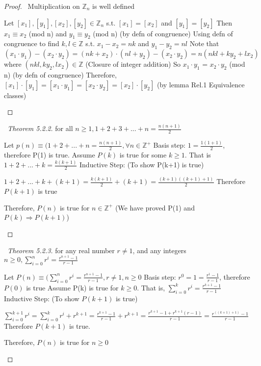 \documentclass[a4paper]{article}
\theoremstyle{definition}
\begin{document}
\begin{proof}{\proofname\ Multiplication on $\mathbb{Z}_n$ is well defined}
  \begin{numpf}
    \pfln Let $[x_1], [y_1], [x_2], [y_2] \in \mathbb{Z}_n$ s.t. $[x_1] = [x_2]$ and $[y_1] = [y_2]$
    \pfln Then $x_1 \equiv x_2$ (mod n) and $y_1 \equiv y_2$ (mod n) (by defn of congruence)
    \pfln Using defn of congruence to find $k, l \in \mathbb{Z}$ s.t. $x_1 - x_2 = nk$ and $y_1 - y_2 = nl$
    \pfln Note that $(x_1 \cdot y_1) - (x_2 \cdot y_2) = (nk + x_2) \cdot (nl + y_2) - (x_2 \cdot y_2) = n(nkl + ky_2 + lx_2)$ where $(nkl, ky_2, lx_2) \in \mathbb{Z}$ (Closure of integer addition)
    \pfln So $x_1 \cdot y_1$ = $x_2 \cdot y_2$ (mod n) (by defn of congruence)
    \pfln Therefore, $[x_1] \cdot [y_1] = [x_1\cdot y_1] = [x_2\cdot y_2] = [x_2] \cdot [y_2]$ (by lemma Rel.1 Equivalence classes)
  \end{numpf}
\end{proof}

\begin{proof}[\proofname\ Theorem 5.2.2] for all $n \geq 1, 1 + 2 + 3 + ... + n = \frac{n(n+1)}{2}$
  \begin{numpf}
    \pfln Let $p(n) \equiv (1+2+...+n = \frac{n(n+1)}{2}, \forall n \in \mathbb{Z}^+$
    \pfln Basis step: $1 = \frac{1(1+1)}{2}$, therefore P(1) is true.
    \pfln Assume $P(k)$ is true for some $k \geq 1$. That is $1+2+...+k = \frac{k(k+1)}{2}$
    \pfln Inductive Step: (To show P(k+1) is true)
    \begin{subpf}
      \pfln $1+2+...+k + (k+1) = \frac{k(k+1)}{2} + (k+1) = \frac{(k+1)((k+1)+1)}{2}$
      \pfln Therefore $P(k+1)$ is true
    \end{subpf}
    \pfln Therefore, $P(n)$ is true for $n\in \mathbb{Z}^+$ (We have proved P(1) and $P(k) \Rightarrow P(k+1)$)
  \end{numpf}
\end{proof}


\begin{proof}[\proofname\ Theorem 5.2.3] for any real number $r \not = 1$, and any integers $n \geq 0, \sum^{n}_{i=0} r^i = \frac{r^{n+1}-1}{r-1}$
  \begin{numpf}
    \pfln Let $P(n) \equiv (\sum^n_{i=0}r^i = \frac{r^{n+1}-1}{r-1}, r \not = 1, n \geq 0$
    \pfln Basis step: $r^0 = 1 = \frac{r^1 - 1}{r-1}$, therefore $P(0)$ is true
    \pfln Assume P(k) is true for $k \geq 0$. That is, $\sum^k_{i=0}r^i = \frac{r^{k+1}-1}{r-1}$
    \pfln Inductive Step: (To show $P(k+1)$ is true)
    \begin{subpf}
    \pfln $\sum^{k+1}_{i=0}r^i = \sum^k_{i=0}r^i + r^{k+1} = \frac{r^{k+1}-1}{r-1} + r^{k+1} = \frac{r^{k+1}-1+r^{k+1}(r-1)}{r-1} = \frac{r^{((k+1)+1)}-1}{r-1}$
    \pfln Therefore $P(k+1)$ is true. 
    \end{subpf}
    \pfln Therefore, $P(n)$ is true for $n \geq 0$
  \end{numpf}
\end{proof}
\end{document}

